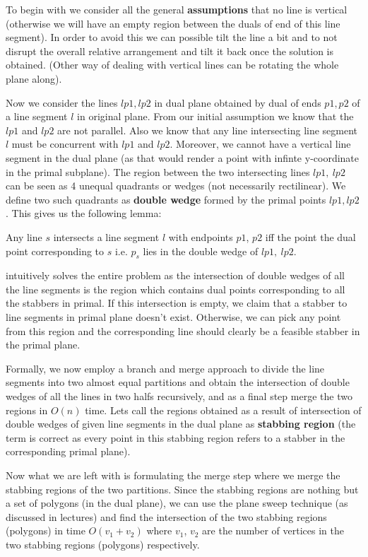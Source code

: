To begin with we consider all the general \textbf{assumptions} that no line is vertical (otherwise we will have an empty region between the duals of end of this line segment). In order to avoid this we can possible tilt the line a bit and to not disrupt the overall relative arrangement and tilt it back once the solution is obtained. (Other way of dealing with vertical lines can be rotating the whole plane along). 

Now we consider the lines $lp1, lp2$ in dual plane obtained by dual of ends $p1, p2$ of a line segment $l$ in original plane. From our initial assumption we know that the $lp1$ and $lp2$ are not parallel. Also we know that any line intersecting line segment $l$ must be concurrent with $lp1$ and $lp2$. Moreover, we cannot have a vertical line segment in the dual plane (as that would render a point with infinte y-coordinate in the primal subplane). The region between the two intersecting lines $lp1,\ lp2$ can be seen as 4 unequal quadrants or wedges (not necessarily rectilinear). We define two such quadrants as \textbf{double wedge} formed by the primal points $lp1, lp2$.  This gives us the following lemma:

\begin{lemma} \label{lem:two}
 Any line $s$ intersects a line segment $l$ with endpoints $p1$, $p2$ iff the point the dual point corresponding to $s$ i.e. $p_s$ lies in the double wedge of $lp1,\ lp2$.
\end{lemma}

 intuitively solves the entire problem as the intersection of double wedges of all the line segments is the region which contains dual points corresponding to all the stabbers in primal. If this intersection is empty, we claim that a stabber to line segments in primal plane doesn't exist. Otherwise, we can pick any point from this region and the corresponding line should clearly be a feasible stabber in the primal plane.

Formally, we now employ a branch and merge approach to divide the line segments into two almost equal partitions and obtain the intersection of double wedges of all the lines in two halfs recursively, and as a final step merge the two regions in $O(n)$ time. Lets call the regions obtained as a result of intersection of double wedges of given line segments in the dual plane as \textbf{stabbing region} (the term is correct as every point in this stabbing region refers to a stabber in the corresponding primal plane).

Now what we are left with is formulating the merge step where we merge the stabbing regions of the two partitions. Since the stabbing regions are nothing but a set of polygons (in the dual plane), we can use the plane sweep technique (as discussed in lectures) and find the intersection of the two stabbing regions (polygons) in time $O(v_1+v_2)$ where $v_1$, $v_2$ are the number of vertices in the two stabbing regions (polygons) respectively. 

